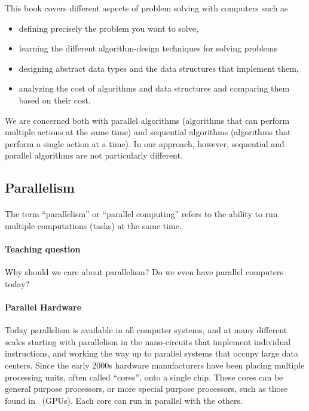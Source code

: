 This book covers different aspects of problem solving with computers
such as 
\begin{itemize}
\item defining precisely the problem you want to solve,
\item learning the different algorithm-design techniques for solving problems
\item designing abstract data types and the data structures that
  implement them,
%
\item analyzing the cost of algorithms and data structures and
  comparing them based on their cost.
%
\end{itemize}

We are concerned both with 
%
parallel algorithms (algorithms that can perform multiple actions at
the same time)
%
and 
%
sequential algorithms (algorithms that perform a single action at a
time).
%
In our approach, however, sequential and parallel algorithms are not
particularly different.
%



\subsection{Parallelism}

\paragraph{}
The term ``parallelism'' or ``parallel computing'' refers to the
ability to run multiple computations (tasks) at the same time.
%

\paragraph{Teaching question}
Why should we care about parallelism?  
%
Do we even have parallel computers today?

\paragraph{Parallel Hardware}
Today parallelism is available in all computer systems, and at many
different scales starting with parallelism in the nano-circuits that
implement individual instructions, and working the way up to parallel
systems that occupy large data centers.  Since the early 2000s
hardware manufacturers have been placing multiple processing units,
often called ``cores'', onto a single chip.  These cores can be
general purpose processors, or more special purpose processors, such as
those found in~ (GPUs).  Each core can
run in parallel with the others.  

